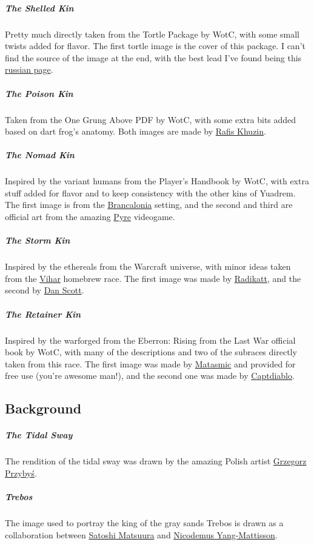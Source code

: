     \subparagraph{The Shelled Kin} Pretty much directly taken from the Tortle Package by WotC, with some small twists added for flavor.
    The first tortle image is the cover of this package.
    I can't find the source of the image at the end, with the best lead I've found being this \href{https://avatarko.ru/kartinka/30751}{russian page}.

    \subparagraph{The Poison Kin} Taken from the One Grung Above PDF by WotC, with some extra bits added based on dart frog's anatomy.
    Both images are made by \href{https://www.artstation.com/rafis}{Rafis Khuzin}.

    \subparagraph{The Nomad Kin} Inspired by the variant humans from the Player's Handbook by WotC, with extra stuff added for flavor and to keep consistency with the other kins of Yuadrem.
    The first image is from the \href{https://www.kickstarter.com/projects/acherongames/brancalonia-the-spaghetti-fantasy-rpg?lang=es}{Brancalonia} setting, and the second and third are official art from the amazing \href{https://www.supergiantgames.com/games/pyre/}{Pyre} videogame.

    \subparagraph{The Storm Kin} Inspired by the ethereals from the Warcraft universe, with minor ideas taken from the \href{https://www.dandwiki.com/wiki/Vihar_(5e_Race)}{Vihar} homebrew race.
    The first image was made by \href{https://radikatt.tumblr.com/}{Radikatt}, and the second by \href{https://twitter.com/danscottart}{Dan Scott}.

    \subparagraph{The Retainer Kin} Inspired by the warforged from the Eberron: Rising from the Last War official book by WotC, with many of the descriptions and two of the subraces directly taken from this race.
    The first image was made by \href{https://www.reddit.com/user/Matasmic/}{Matasmic} and provided for free use (you're awesome man!), and the second one was made by \href{https://www.reddit.com/user/captdiablo/}{Captdiablo}.

\subsection*{Background}
    \subparagraph{The Tidal Sway} The rendition of the tidal sway was drawn by the amazing Polish artist \href{https://grzegorzprzybys.artstation.com/}{Grzegorz Przybyś}.

    \subparagraph{Trebos} The image used to portray the king of the gray sands Trebos is drawn as a collaboration between \href{https://www.artstation.com/hiziripro}{Satoshi Matsuura} and \href{https://www.artstation.com/nicodemus}{Nicodemus Yang-Mattisson}.

